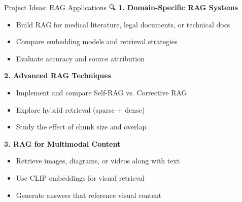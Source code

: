 \documentclass[aspectratio=169]{beamer}
\begin{document}
\begin{frame}[shrink=10]{Project Ideas: RAG Applications 🔍}
\textbf{1. Domain-Specific RAG Systems}
\begin{itemize}\setlength{\itemsep}{0pt}
    \item Build RAG for medical literature, legal documents, or technical docs
    \item Compare embedding models and retrieval strategies
    \item Evaluate accuracy and source attribution
\end{itemize}

\vspace{0.5em}

\textbf{2. Advanced RAG Techniques}
\begin{itemize}\setlength{\itemsep}{0pt}
    \item Implement and compare Self-RAG vs. Corrective RAG
    \item Explore hybrid retrieval (sparse + dense)
    \item Study the effect of chunk size and overlap
\end{itemize}

\vspace{0.5em}

\textbf{3. RAG for Multimodal Content}
\begin{itemize}\setlength{\itemsep}{0pt}
    \item Retrieve images, diagrams, or videos along with text
    \item Use CLIP embeddings for visual retrieval
    \item Generate answers that reference visual content
\end{itemize}
\end{frame}
\end{document}
